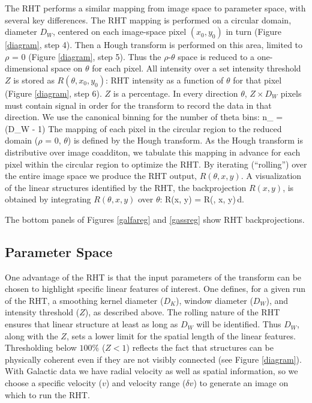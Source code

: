 The RHT performs a similar mapping from image space to parameter space, with several key differences. The RHT mapping is performed on a circular domain, diameter $D_W$, centered on each image-space pixel $\left(x_0, y_0\right)$ in turn (Figure \ref{diagram}, step 4). Then a Hough transform is performed on this area, limited to  ${\rho}$ = 0 (Figure \ref{diagram}, step 5). Thus the $\rho$-$\theta$ space is reduced to a one-dimensional space on $\theta$ for each pixel. All intensity over a set intensity threshold $Z$ is stored as $R(\theta, x_0, y_0)$: RHT intensity as a function of $\theta$ for that pixel (Figure \ref{diagram}, step 6). $Z$ is a percentage. In every direction ${\theta}$, $Z \times D_W$ pixels must contain signal in order for the transform to record the data in that direction.
We use the canonical binning for the number of theta bins:
\beq
n_{\theta} = \left\lceil\pi {} \left(D_W - 1\right) \right\rceil
\eeq
The mapping of each pixel in the circular region to the reduced domain (${\rho}$ = 0, ${\theta}$) is defined by the Hough transform. 
As the Hough transform is distributive over image coadditon, we tabulate this mapping in advance for each pixel within the circular region to optimize the RHT. By iterating (``rolling'') over the entire image space we produce the RHT output, $R\left(\theta, x, y\right)$.
A visualization of the linear structures identified by the RHT, the backprojection $R\left(x, y\right)$, is obtained by integrating ${R(\theta, x, y)}$ over ${\theta}$:
\beq\label{Bxy}
R(x, y) = \int R(\theta, x, y)\,d\theta.
\eeq

The bottom panels of Figures \ref{galfareg} and \ref{gassreg} show RHT backprojections.

\subsection{Parameter Space}\label{pspace}

One advantage of the RHT is that the input parameters of the transform can be chosen to highlight specific linear features of interest. One defines, for a given run of the RHT, a smoothing kernel diameter ($D_K$), window diameter ($D_W$), and intensity threshold ($Z$), as described above. The rolling nature of the RHT ensures that linear structure at least as long as $D_W$ will be identified. Thus $D_W$, along with the $Z$, sets a lower limit for the spatial length of the linear features. Thresholding below ${100\%}$ ($Z < 1$) reflects the fact that structures can be physically coherent even if they are not visibly connected (see Figure \ref{diagram}). With Galactic \hi data we have radial velocity as well as spatial information, so we choose a specific velocity ($v$) and velocity range ($\delta v$) to generate an image on which to run the RHT.

